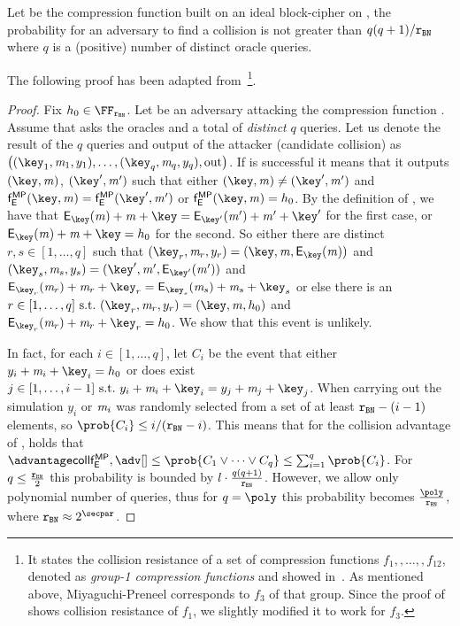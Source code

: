 \begin{lemma}\label{lemma:colrescomp}
    Let \fMP{} be the \MP{} compression function built on an ideal block-cipher \Enc{} on \FFx{\rBN}, the probability for an adversary \adv{} to find a collision is not greater than $q(q+1)/\mathtt{r_{BN}}$ where $q$ is a (positive) number of distinct oracle queries.
\end{lemma}

The following proof has been adapted from~\cite[Lemma 3.3]{black2002black}\footnote{It states the collision resistance of a set of compression functions $f_1,,\ldots,,f_{12}$, denoted as \emph{group-1 compression functions} and showed in~\cite[Figure 3]{black2002black}. As mentioned above, Miyaguchi-Preneel corresponds to $f_3$ of that group. Since the proof of~\cite[Lemma 3.3]{black2002black} shows collision resistance of $f_1$, we slightly modified it to work for $f_3$.}.

\begin{proof}
    Fix $h_0\in\FFx{\rBN}$. Let \adv{} be an adversary attacking the compression function \fMP{}.
    Assume that \adv{} asks the oracles \oracleEnc{} and \oracleDec{} a total of \emph{distinct} $q$ queries. Let us denote the result of the $q$ queries and output of the attacker (candidate collision) as $\left ( (\key_1, \msg_1, y_1), \ldots , (\key_q, \msg_q, y_q), \text{out} \right )$.
    If \adv{} is successful it means that it outputs $(\key, \msg)$, $(\key', \msg')$ such that either $(\key, \msg) \neq (\key', \msg')$ and $\fMP(\key, \msg) = \fMP(\key', \msg')$ or $\fMP(\key, \msg) = h_0$.
    By the definition of \fMP, we have that $\Enc_\key(\msg) + \msg + \key = \Enc_{\key'}(\msg') + \msg' + \key'$ for the first case, or $\Enc_\key(\msg) + \msg + \key = h_0$ for the second.
    So either there are distinct $r, s \in [1,\ldots, q]$ such that $(\key_r, \msg_r, y_r) = (\key, \msg, \Enc_\key(\msg))$ and $(\key_s,\msg_s, y_s) = (\key',\msg', \Enc_{\key'}(\msg'))$ and $\Enc_{\key_r}(\msg_r) + \msg_r + \key_r = \Enc_{\key_s}(\msg_s) + \msg_s + \key_s$ or else there is an $r \in [1,\ldots, q]\ \suchthat\ (\key_r, \msg_r, y_r) = (\key, \msg, h_0)$ and $\Enc_{\key_r}(\msg_r) + \msg_r + \key_r = h_0$. We show that this event is unlikely.

    In fact, for each $i \in [1,\ldots, q]$, let $C_i$ be the event that either $y_i + \msg_i + \key_i = h_0$ or does exist $j \in [1,\ldots, i-1]\ \suchthat\ y_i + \msg_i + \key_i = y_j + \msg_j + \key_j$. When carrying out the simulation $y_i$ or $\mathit{m}_i$ was randomly selected from a set of at least $\mathtt{r_{BN}} - (i-1)$ elements, so $\prob{C_i}\leq i / (\rBN-i)$. This means that for the collision advantage of \adv{}, \advCollMP holds that $\advCollMP \leq \prob{C_1 \lor \cdots \lor C_q} \leq \sum_{i=1}^{q} \prob{C_i}$. For $q \leq \frac{\mathtt{r_{BN}}}{2}$ this probability is bounded by $l \cdot \frac{q(q+1)}{\mathtt{r_{BN}}}$. However, we allow only polynomial number of queries, thus for $q = \poly$ this probability becomes $\frac{\poly}{\rBN}$, where $\rBN \approx 2^\secpar$.
\end{proof}

